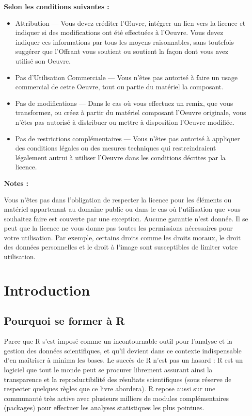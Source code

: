 \documentclass[]{book}
\theoremstyle{definition}
\theoremstyle{definition}
\theoremstyle{definition}
\theoremstyle{remark}
\begin{document}
\textbf{Selon les conditions suivantes :}

\begin{itemize}
\item
  Attribution --- Vous devez créditer l'Œuvre, intégrer un lien vers la
  licence et indiquer si des modifications ont été effectuées à
  l'Oeuvre. Vous devez indiquer ces informations par tous les moyens
  raisonnables, sans toutefois suggérer que l'Offrant vous soutient ou
  soutient la façon dont vous avez utilisé son Oeuvre.
\item
  Pas d'Utilisation Commerciale --- Vous n'êtes pas autorisé à faire un
  usage commercial de cette Oeuvre, tout ou partie du matériel la
  composant.
\item
  Pas de modifications --- Dans le cas où vous effectuez un remix, que
  vous transformez, ou créez à partir du matériel composant l'Oeuvre
  originale, vous n'êtes pas autorisé à distribuer ou mettre à
  disposition l'Oeuvre modifiée.
\item
  Pas de restrictions complémentaires --- Vous n'êtes pas autorisé à
  appliquer des conditions légales ou des mesures techniques qui
  restreindraient légalement autrui à utiliser l'Oeuvre dans les
  conditions décrites par la licence.
\end{itemize}

\textbf{Notes :}

Vous n'êtes pas dans l'obligation de respecter la licence pour les
éléments ou matériel appartenant au domaine public ou dans le cas où
l'utilisation que vous souhaitez faire est couverte par une exception.
Aucune garantie n'est donnée. Il se peut que la licence ne vous donne
pas toutes les permissions nécessaires pour votre utilisation. Par
exemple, certains droits comme les droits moraux, le droit des données
personnelles et le droit à l'image sont susceptibles de limiter votre
utilisation.

\chapter{Introduction}\label{intro}

\section{Pourquoi se former à R}\label{pourquoi-se-former-a-r}

Parce que R s'est imposé comme un incontournable outil pour l'analyse et
la gestion des données scientifiques, et qu'il devient dans ce contexte
indispensable d'en maîtriser à minima les bases. Le succès de R n'est
pas un hasard : R est un logiciel que tout le monde peut se procurer
librement assurant ainsi la transparence et la reproductibilité des
résultats scientifiques (sous réserve de respecter quelques règles que
ce livre abordera). R repose aussi sur une communauté très active avec
plusieurs milliers de modules complémentaires (packages) pour effectuer
les analyses statistiques les plus pointues.
\end{document}
